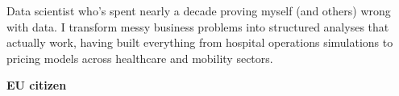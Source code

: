 

\begin{cvparagraph}
\begin{minipage}[t]{0.4\textwidth} %

Data scientist who's spent nearly a decade proving myself (and others) wrong with data.
I transform messy business problems into structured analyses that actually work, having
built everything from hospital operations simulations to pricing models across healthcare
and mobility sectors.

\medskip
\textbf{EU citizen}

\end{minipage}
\hfill
\begin{minipage}[t]{0.55\textwidth} %

\end{minipage}
\end{cvparagraph}
